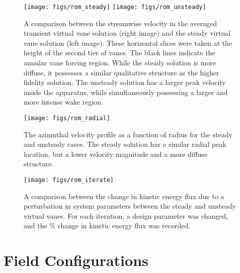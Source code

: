 \begin{figure}[htp!]
 \centering
 \texttt{[image: figs/rom\_steady]}
 \hfill
 \texttt{[image: figs/rom\_unsteady]}%
 \caption{A comparison between the streamwise velocity in the averaged
 transient virtual vane solution (right image) and the steady virtual
 vane solution (left image). These horizontal slices were taken at the
 height of the second tier of vanes. The black lines indicate the
 annular vane forcing region. While the steady solution is more diffuse,
 it possesses a similar qualitative structure as the higher fidelity
 solution. The unsteady solution has a larger peak velocity inside the
 apparatus, while simultaneously possessing a larger and more intense
 wake region.}
 \label{fig:rom_compare}  
\end{figure}


\begin{figure}[htp!]
 \centering
 \texttt{[image: figs/rom\_radial]}
 \caption{The azimuthal velocity profile as a function of radius for the
 steady and unsteady cases. The steady solution has a similar radial
 peak location, but a lower velocity magnitude and a more diffuse
 structure.}   
 \label{fig:rom_az}
\end{figure}



\begin{figure}[htp!]
 \centering
 \texttt{[image: figs/rom\_iterate]}
 \caption{A comparison between the change in kinetic energy flux due to
 a perturbation in system parameters between the steady and unsteady
 virtual vanes. For each iteration, a design parameter was changed, and
 the \% change in kinetic energy flux was recorded.}    
 \label{fig:rom_it}  
\end{figure}

\section{Field Configurations}
\label{sec:field_val}


